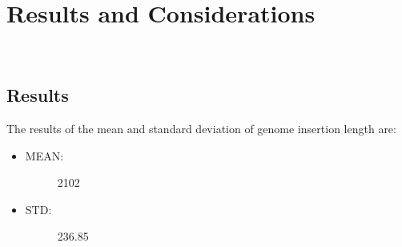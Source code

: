 
\chapter{Results and Considerations}
\label{cap:considerations}

\\
\section{Results}
\normalsize
The results of the mean and standard deviation of genome insertion length are:
\begin{itemize}
\item \begin{description}
		\item[MEAN:] 2102
  \end{description}
\end{itemize}

\begin{itemize}
\item \begin{description}
		\item[STD:] 236.85
  \end{description}
\end{itemize}

